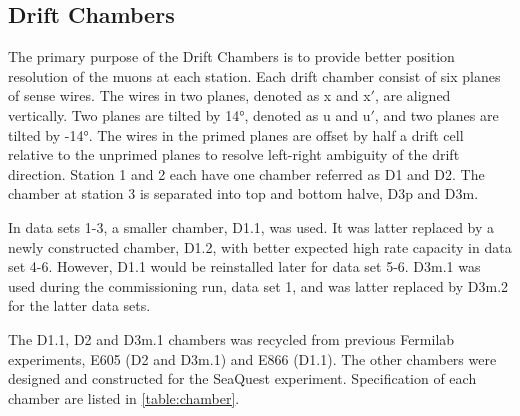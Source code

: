 \documentclass[../main.tex]{subfiles}
\begin{document}
\subsection{Drift Chambers}
The primary purpose of the Drift Chambers is to provide better position resolution of the muons
at each station. Each drift chamber consist of six planes of sense wires. The wires in two planes,
denoted as x and x$'$, are aligned vertically. Two planes are tilted by \ang[retain-explicit-plus]{+14},
denoted as u and u$'$, and two planes are tilted by \ang[retain-explicit-plus]{-14}. The wires
in the primed planes are offset by half a drift cell relative to the unprimed planes to resolve left-right ambiguity of the
drift direction. Station 1 and 2 each have one chamber referred as D1 and D2. The chamber at station
3 is separated into top and bottom halve, D3p and D3m.

In data sets 1-3, a smaller chamber, D1.1, was used. It was latter replaced by a newly constructed
chamber, D1.2, with better expected high rate capacity in data set 4-6. However, D1.1 would be
reinstalled later for data set 5-6. D3m.1 was used during the commissioning run, data set 1, and
was latter replaced by D3m.2 for the latter data sets.

The D1.1, D2 and D3m.1 chambers was recycled from previous Fermilab experiments, E605 (D2 and D3m.1)
and E866 (D1.1). The other chambers were designed and constructed for the SeaQuest experiment.
Specification of each chamber are listed in \cref{table:chamber}.
\end{document}
